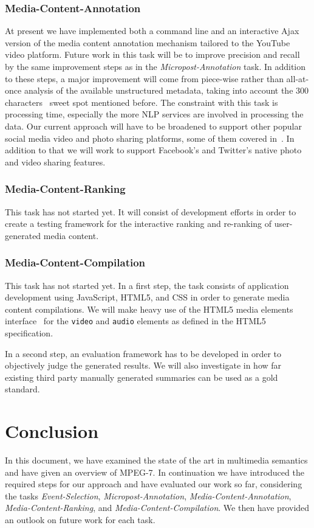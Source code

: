 \documentclass[runningheads,a4paper]{llncs}
\begin{document}
\subsubsection{Media-Content-Annotation}
At present we have implemented both a command line and an interactive Ajax version of the media content annotation mechanism tailored to the YouTube video platform. Future work in this task will be to improve precision and recall by the same improvement steps as in the \emph{Micropost-Annotation} task. In addition to these steps, a major improvement will come from piece-wise rather than all-at-once analysis of the available unstructured metadata, taking into account the 300 characters~\cite{andraz} sweet spot mentioned before. The constraint with this task is processing time, especially the more NLP services are involved in processing the data. Our current approach will have to be broadened to support other popular social media video and photo sharing platforms, some of them covered in~\cite{techcrunch}. In addition to that we will work to support Facebook's and Twitter's native photo and video sharing features.

\subsubsection{Media-Content-Ranking}
This task has not started yet. It will consist of development efforts in order to create a testing framework for the interactive ranking and re-ranking of user-generated media content. 

\subsubsection{Media-Content-Compilation}
This task has not started yet. In a first step, the task consists of application development using JavaScript, HTML5, and CSS in order to generate media content compilations. We will make heavy use of the HTML5 media elements interface~\cite{mediaelements} for the \texttt{video} and \texttt{audio} elements as defined in the HTML5 specification.

In a second step, an evaluation framework has to be developed in order to objectively judge the generated results. We will also investigate in how far existing third party manually generated summaries can be used as a gold standard.
 
\section{Conclusion}
In this document, we have examined the state of the art in multimedia semantics and have given an overview of MPEG-7. In continuation we have introduced the required steps for our approach and have evaluated our work so far, considering the tasks \emph{Event-Selection}, \emph{Micropost-Annotation}, \emph{Media-Content-Annotation}, \emph{Media-Content-Ranking}, and \emph{Media-Content-Compilation}. We then have provided an outlook on future work for each task.
\end{document}
